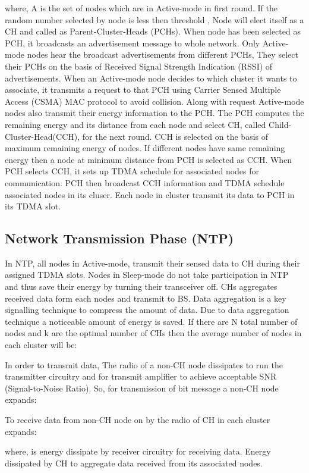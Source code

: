 \documentclass[journal]{IEEEtran}
\begin{document}
where, A is the set of nodes which are in Active-mode in first round. If the random number selected by node is less then threshold , Node will elect itself as a CH and called as Parent-Cluster-Heads (PCHs). When node has been selected as PCH, it broadcasts an advertisement message to whole network. Only Active-mode nodes hear the broadcast advertisements from different PCHs, They select their PCHs on the basis of Received Signal Strength Indication (RSSI) of advertisements. When an Active-mode node decides to which cluster it wants to associate, it transmits a request to that PCH using Carrier Sensed Multiple Access (CSMA) MAC protocol to avoid collision. Along with request Active-mode nodes also transmit their energy information to the PCH. The PCH computes the remaining energy and its distance from each node and select CH, called Child-Cluster-Head(CCH), for the next round. CCH is selected on the basis of maximum remaining energy of nodes. If different nodes have same remaining energy then a node at minimum distance from PCH is selected as CCH. When PCH selects CCH, it sets up TDMA schedule for associated nodes for communication. PCH then broadcast CCH information and TDMA schedule associated nodes in its cluser. Each node in cluster transmit its data to PCH in its TDMA slot.

\subsection{Network Transmission Phase (NTP)}
In NTP, all nodes in Active-mode, transmit their sensed data to CH during their assigned TDMA slots. Nodes in Sleep-mode do not take participation in NTP and thus save their energy by turning their transceiver off. CHs aggregates received data form each nodes and transmit to BS. Data aggregation is a key signalling technique to compress the amount of data. Due to data aggregation technique a noticeable amount of energy is saved.
If there are N total number of nodes and k are the optimal number of CHs then the average number of nodes in each cluster will be:


In order to transmit data, The radio of a non-CH node dissipates  to run the transmitter circuitry and  for transmit amplifier to achieve acceptable SNR (Signal-to-Noise Ratio). So, for transmission of  bit message a non-CH node expands:

To receive data from non-CH node on by the radio of CH in each cluster expands:


 where,  is energy dissipate by receiver circuitry for receiving data. Energy dissipated by CH to aggregate data received from its associated nodes.
\end{document}

